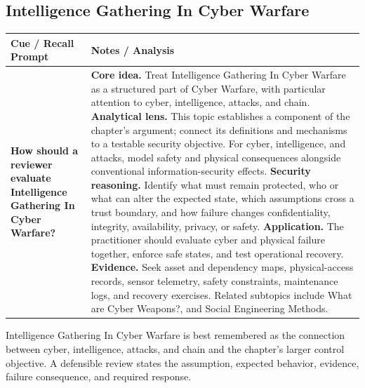 \documentclass[11pt]{article}
\newcommand{\CornellHeader}{%
\rowcolor{Navy}\color{white}\bfseries Cue / Recall Prompt & \color{white}\bfseries Notes / Analysis\\\hline}
\newcommand{\CornellRow}[2]{%
\cellcolor{CueGray}\RaggedRight\textbf{#1} & \RaggedRight #2\\\hline}
\begin{document}
\subsection*{Intelligence Gathering In Cyber Warfare}
\begin{longtable}{>{\RaggedRight\arraybackslash}p{}|>{\RaggedRight\arraybackslash}p{}}
\CornellHeader
\CornellRow{How should a reviewer evaluate Intelligence Gathering In Cyber Warfare?}{\textbf{Core idea.} Treat Intelligence Gathering In Cyber Warfare as a structured part of Cyber Warfare, with particular attention to cyber, intelligence, attacks, and chain. \textbf{Analytical lens.} This topic establishes a component of the chapter's argument; connect its definitions and mechanisms to a testable security objective. For cyber, intelligence, and attacks, model safety and physical consequences alongside conventional information-security effects. \textbf{Security reasoning.} Identify what must remain protected, who or what can alter the expected state, which assumptions cross a trust boundary, and how failure changes confidentiality, integrity, availability, privacy, or safety. \textbf{Application.} The practitioner should evaluate cyber and physical failure together, enforce safe states, and test operational recovery. \textbf{Evidence.} Seek asset and dependency maps, physical-access records, sensor telemetry, safety constraints, maintenance logs, and recovery exercises. Related subtopics include What are Cyber Weapons?, and Social Engineering Methods.}
\end{longtable}
\begin{topicsummary}
Intelligence Gathering In Cyber Warfare is best remembered as the connection between cyber, intelligence, attacks, and chain and the chapter's larger control objective. A defensible review states the assumption, expected behavior, evidence, failure consequence, and required response.
\end{topicsummary}
\end{document}
